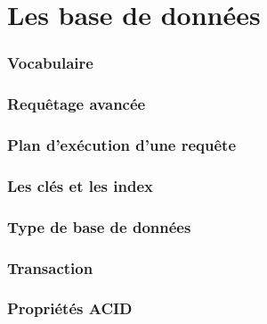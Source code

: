 \section{Les base de données}
\label{sec:persistence}

\begin{frame}
    \frametitle{Vocabulaire}
\end{frame}

\begin{frame}
    \frametitle{Requêtage avancée}
\end{frame}

\begin{frame}
    \frametitle{Plan d'exécution d'une requête}
\end{frame}

\begin{frame}
    \frametitle{Les clés et les index}
\end{frame}

\begin{frame}
    \frametitle{Type de base de données}
\end{frame}

\begin{frame}
    \frametitle{Transaction}
\end{frame}

\begin{frame}
    \frametitle{Propriétés ACID}
\end{frame}

